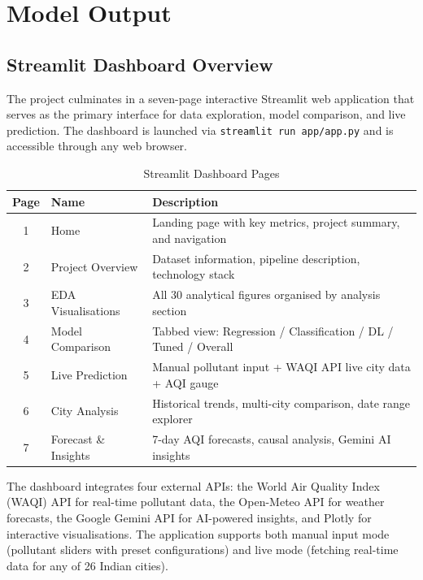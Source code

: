 \documentclass[12pt,a4paper]{report}
\begin{document}
\clearpage
\chapter{Model Output}\label{idx:ch7}

\section{Streamlit Dashboard Overview}\label{idx:s71}

The project culminates in a seven-page interactive Streamlit web application that serves as the primary interface for data exploration, model comparison, and live prediction. The dashboard is launched via \texttt{streamlit run app/app.py} and is accessible through any web browser.

\begin{table}[H]
\centering
\caption{Streamlit Dashboard Pages}
\label{tab:dashboard_pages}
\begin{tabular}{|c|l|p{7cm}|}
\hline
\textbf{Page} & \textbf{Name} & \textbf{Description} \\
\hline
1 & Home & Landing page with key metrics, project summary, and navigation \\
\hline
2 & Project Overview & Dataset information, pipeline description, technology stack \\
\hline
3 & EDA Visualisations & All 30 analytical figures organised by analysis section \\
\hline
4 & Model Comparison & Tabbed view: Regression / Classification / DL / Tuned / Overall \\
\hline
5 & Live Prediction & Manual pollutant input + WAQI API live city data + AQI gauge \\
\hline
6 & City Analysis & Historical trends, multi-city comparison, date range explorer \\
\hline
7 & Forecast \& Insights & 7-day AQI forecasts, causal analysis, Gemini AI insights \\
\hline
\end{tabular}
\end{table}

The dashboard integrates four external APIs: the World Air Quality Index (WAQI) API for real-time pollutant data, the Open-Meteo API for weather forecasts, the Google Gemini API for AI-powered insights, and Plotly for interactive visualisations. The application supports both manual input mode (pollutant sliders with preset configurations) and live mode (fetching real-time data for any of 26 Indian cities).
\end{document}

